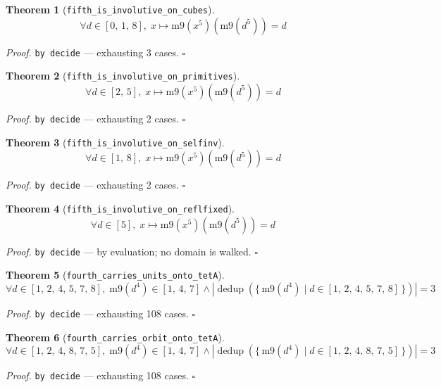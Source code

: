 \documentclass[11pt]{article}
\newtheorem{theorem}{Theorem}[section]
\begin{document}
\begin{theorem}[\texttt{fifth\_is\_involutive\_on\_cubes}]
\[ \forall d \in [0,\,1,\,8],\; x \mapsto \mathrm{m9}\mathopen{}\left(x^{5}\right)\mathopen{}\left(\mathrm{m9}\mathopen{}\left(d^{5}\right)\right) = d \]
\end{theorem}
\noindent\emph{Proof.} \texttt{by decide} --- exhausting 3 cases. \hfill$\square$

\begin{theorem}[\texttt{fifth\_is\_involutive\_on\_primitives}]
\[ \forall d \in [2,\,5],\; x \mapsto \mathrm{m9}\mathopen{}\left(x^{5}\right)\mathopen{}\left(\mathrm{m9}\mathopen{}\left(d^{5}\right)\right) = d \]
\end{theorem}
\noindent\emph{Proof.} \texttt{by decide} --- exhausting 2 cases. \hfill$\square$

\begin{theorem}[\texttt{fifth\_is\_involutive\_on\_selfinv}]
\[ \forall d \in [1,\,8],\; x \mapsto \mathrm{m9}\mathopen{}\left(x^{5}\right)\mathopen{}\left(\mathrm{m9}\mathopen{}\left(d^{5}\right)\right) = d \]
\end{theorem}
\noindent\emph{Proof.} \texttt{by decide} --- exhausting 2 cases. \hfill$\square$

\begin{theorem}[\texttt{fifth\_is\_involutive\_on\_reflfixed}]
\[ \forall d \in [5],\; x \mapsto \mathrm{m9}\mathopen{}\left(x^{5}\right)\mathopen{}\left(\mathrm{m9}\mathopen{}\left(d^{5}\right)\right) = d \]
\end{theorem}
\noindent\emph{Proof.} \texttt{by decide} --- by evaluation; no domain is walked. \hfill$\square$

\begin{theorem}[\texttt{fourth\_carries\_units\_onto\_tetA}]
\[ \forall d \in [1,\,2,\,4,\,5,\,7,\,8],\; \mathrm{m9}\mathopen{}\left(d^{4}\right) \in [1,\,4,\,7] \land \left|\operatorname{dedup}\left(\{\, \mathrm{m9}\mathopen{}\left(d^{4}\right) \mid d \in [1,\,2,\,4,\,5,\,7,\,8] \,\}\right)\right| = 3 \]
\end{theorem}
\noindent\emph{Proof.} \texttt{by decide} --- exhausting 108 cases. \hfill$\square$

\begin{theorem}[\texttt{fourth\_carries\_orbit\_onto\_tetA}]
\[ \forall d \in [1,\,2,\,4,\,8,\,7,\,5],\; \mathrm{m9}\mathopen{}\left(d^{4}\right) \in [1,\,4,\,7] \land \left|\operatorname{dedup}\left(\{\, \mathrm{m9}\mathopen{}\left(d^{4}\right) \mid d \in [1,\,2,\,4,\,8,\,7,\,5] \,\}\right)\right| = 3 \]
\end{theorem}
\noindent\emph{Proof.} \texttt{by decide} --- exhausting 108 cases. \hfill$\square$
\end{document}
